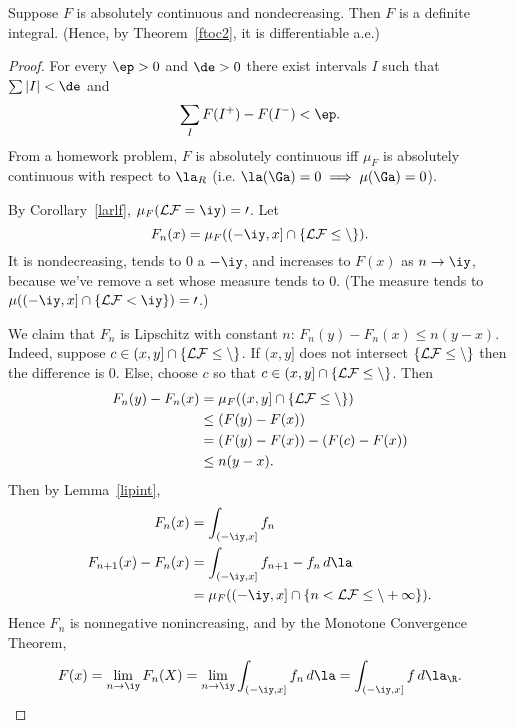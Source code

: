 \begin{lem}\label{abint}
Suppose $F$ is absolutely continuous and nondecreasing. Then $F$ is a definite integral. (Hence, by Theorem~\ref{ftoc2}, it is differentiable a.e.)
\end{lem}
\begin{proof}
For every $\ep>0$ and $\de>0$ there exist intervals $I$ such that $\sum |I|<\de$ and
\[
\sum_I F(I^+)-F(I^-)<\ep.
\]
From a homework problem, $F$ is absolutely continuous iff $\mu_F$ is absolutely continuous with respect to $\la_R$ (i.e. $\la(\Ga)=0\implies \mu(\Ga)=0$). 

By Corollary~\ref{larlf}, $\mu_F(\cal LF=\iy)=0$. Let 
\[F_n(x)=\mu_F((-\iy, x]\cap \{\cal LF\le n\}).\]
It is nondecreasing, tends to 0 a $-\iy$, and increases to $F(x)$ as $n\to \iy$, because we've remove a set whose measure tends to 0. (The measure tends to $\mu((-\iy, x]\cap \{\cal L F<\iy\})=0$.)

We claim that $F_n$ is Lipschitz with constant $n$: $F_n(y)-F_n(x)\le n(y-x)$. Indeed, suppose $c\in(x,y]\cap \{\cal LF\leq n\}$. If $(x,y]$ does not intersect $\{\cal LF\le n\}$ then the difference is 0. Else, choose $c$ so that $c\in (x,y]\cap \{\cal LF\le n\}$. Then
\begin{align*}
F_n(y)-F_n(x)&=\mu_F((x,y]\cap \{\cal LF\leq n\})\\
&\le (F(y)-F(x))\\
&=(F(y)-F(x))-(F(c)-F(x))\\
&\le n(y-x).
\end{align*}
 Then by Lemma~\ref{lipint},
\begin{align*}
F_n(x)&=\int_{(-\iy, x]} f_n\\
F_{n+1}(x)-F_n(x)&=\int_{(-\iy, x]} f_{n+1}-f_n \,d\la\\
&=\mu_F((-\iy, x]\cap \{n<\cal L F\le n+1\}).
\end{align*}
Hence $F_n$ is nonnegative nonincreasing, and by the Monotone Convergence Theorem,
\[
F(x)=\lim_{n\to \iy}F_n(X)=\lim_{n\to \iy }\int_{(-\iy,x]} f_n\,d\la=\int_{(-\iy,x]}f\,d\la_{\R}.
\]
\end{proof}

